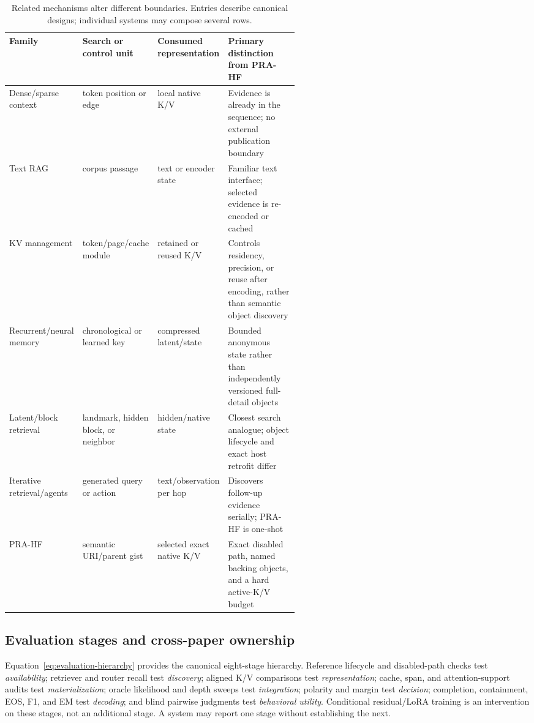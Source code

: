 \documentclass[11pt]{article}
\begin{document}
\begin{table}[H]
\centering
\scriptsize
\setlength{\tabcolsep}{3pt}
\renewcommand{\arraystretch}{0.96}
\caption{Related mechanisms alter different boundaries. Entries describe canonical designs;
individual systems may compose several rows.}
\label{tab:related-boundaries}
\begin{tabularx}{\linewidth}{L{0.16\linewidth}L{0.20\linewidth}L{0.19\linewidth}Y}
\toprule
Family & Search or control unit & Consumed representation & Primary distinction from PRA-HF \\
\midrule
Dense/sparse context & token position or edge & local native K/V & Evidence is already in the sequence; no external publication boundary \\
Text RAG & corpus passage & text or encoder state & Familiar text interface; selected evidence is re-encoded or cached \\
KV management & token/page/cache module & retained or reused K/V & Controls residency, precision, or reuse after encoding, rather than semantic object discovery \\
Recurrent/neural memory & chronological or learned key & compressed latent/state & Bounded anonymous state rather than independently versioned full-detail objects \\
Latent/block retrieval & landmark, hidden block, or neighbor & hidden/native state & Closest search analogue; object lifecycle and exact host retrofit differ \\
Iterative retrieval/agents & generated query or action & text/observation per hop & Discovers follow-up evidence serially; PRA-HF is one-shot \\
PRA-HF & semantic URI/parent gist & selected exact native K/V & Exact disabled path, named backing objects, and a hard active-K/V budget \\
\bottomrule
\end{tabularx}
\end{table}

\subsection{Evaluation stages and cross-paper ownership}

Equation~\ref{eq:evaluation-hierarchy} provides the canonical eight-stage hierarchy. Reference
lifecycle and disabled-path checks test \emph{availability}; retriever and router recall test
\emph{discovery}; aligned K/V comparisons test \emph{representation}; cache, span, and
attention-support audits test \emph{materialization}; oracle likelihood and depth sweeps test
\emph{integration}; polarity and margin test \emph{decision}; completion, containment, EOS, F1,
and EM test \emph{decoding}; and blind pairwise judgments test \emph{behavioral utility}.
Conditional residual/LoRA training is an intervention on these stages, not an additional stage. A
system may report one stage without establishing the next.
\end{document}
